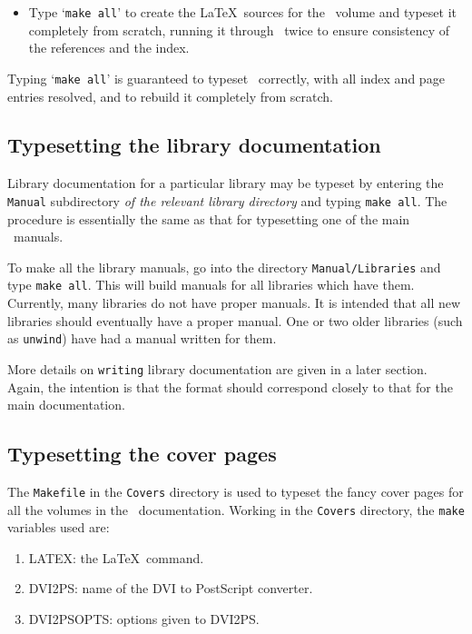 \begin{itemize}

\item Type `{\tt make all}' to create the \LaTeX\ sources for the \REFERENCE\
volume and typeset it completely from scratch, running it through \latex\ twice
to ensure consistency of the references and the index.

\end{itemize}

\noindent Typing `{\tt make all}' is guaranteed to typeset \REFERENCE\
correctly, with all index and page entries resolved, and to rebuild it
completely from scratch.

\subsection{Typesetting the library documentation}

Library documentation for a particular library may be typeset by entering the
{\tt Manual} subdirectory {\it of the relevant library directory} and typing
{\tt make all}. The procedure is essentially the same as that for typesetting
one of the main \HOL\ manuals.

To make all the library manuals, go into the directory {\tt Manual/Libraries}
and type {\tt make all}. This will build manuals for all libraries which have
them. Currently, many libraries do not have proper manuals. It is intended that
all new libraries should eventually have a proper manual. One or two older
libraries (such as {\tt unwind}) have had a manual written for them.

More details on {\tt writing} library documentation are given in a later
section. Again, the intention is that the format should correspond closely to
that for the main documentation.

\subsection{Typesetting the cover pages}\label{PS}

The {\tt Makefile} in the {\tt Covers} directory is used to typeset the
fancy cover pages for all the volumes in the \HOL\ documentation.  Working in
the {\tt Covers} directory, the {\tt make} variables used are:

\begin{enumerate}

\item {\small LATEX}:  the \LaTeX\ command.

\item {\small DVI2PS}: name of the {\small DVI} to PostScript converter.

\item {\small DVI2PSOPTS}: options given to {\small DVI2PS}.

\end{enumerate}

